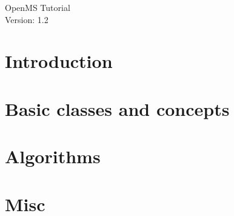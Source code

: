 \documentclass[a4paper]{article}
\begin{document}
\begin{titlepage}
\vspace*{7cm}
\begin{center}
{\Large OpenMS Tutorial\\[1ex]\large Version: 1.2 }\\
\end{center}
\end{titlepage}


\setcounter{tocdepth}{2}
\tableofcontents
\pagebreak

\section{Introduction}

	
	\pagebreak
	
	\pagebreak
	


\pagebreak
\section{Basic classes and concepts}

	
	\pagebreak
	
	\pagebreak
	
	\pagebreak
	
	\pagebreak
	
	\pagebreak
	


\pagebreak
\section{Algorithms}

	
	\pagebreak
	
	\pagebreak
	
	\pagebreak
	

\pagebreak
\section{Misc}

	
	\pagebreak
	
	\pagebreak
	
\end{document}
